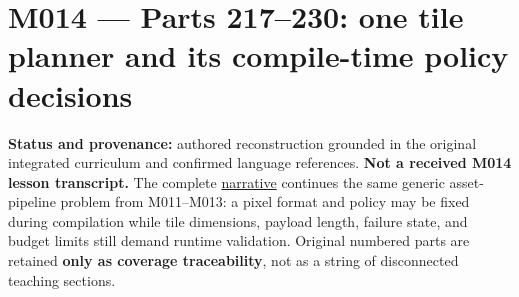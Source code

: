 \section{M014 --- Parts 217--230: one tile planner and its compile-time policy decisions}\label{appendix-fd090d982a15-m014-parts-217230-one-tile-planner-and-its-compile-time-policy-decisions}

\textbf{Status and provenance:} authored reconstruction grounded in the original integrated curriculum and confirmed language references. \textbf{Not a received M014 lesson transcript.} The complete \href{Continuous\%20Notes/Computing\%20Foundations\%20-\%20From\%20Bits\%20to\%20C++\%20and\%20Systems\%20APIs\#A\%20texture\%20tile\%20that\%20chooses\%20its\%20work\%20before\%20the\%20frame\%20begins}{narrative} continues the same generic asset-pipeline problem from M011--M013: a pixel format and policy may be fixed during compilation while tile dimensions, payload length, failure state, and budget limits still demand runtime validation. Original numbered parts are retained \textbf{only as coverage traceability}, not as a string of disconnected teaching sections.

